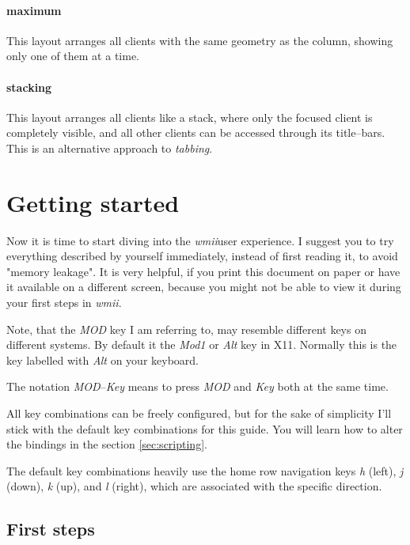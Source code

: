 \documentclass[12pt,a4paper]{article} %
\newcommand{\wmii}{\emph{wmii}}
\begin{document}
    \paragraph{maximum} This layout arranges all clients with
    the same geometry as the column, showing only one of them at a time.
    \paragraph{stacking} This layout arranges all clients
    like a stack, where only the focused client is completely
    visible, and all other clients can be accessed through its title--bars.
    This is an alternative approach to \emph{tabbing}.

    \section{Getting started}

    Now it is time to start diving into the \wmii user experience. I suggest you
    to try everything described by yourself immediately, instead of first reading
    it, to avoid "memory leakage".  It is very helpful, if you print this
    document on paper or have it available on a different screen, because you might not
    be able to view it during your first steps in \wmii.

    Note, that the \emph{MOD} key I am referring to, may resemble
    different keys on different systems. By default it the 
    \emph{Mod1} or \emph{Alt} key in X11. Normally this is the key labelled with
    \emph{Alt} on your keyboard.

    The notation \emph{MOD}--\emph{Key} means to press \emph{MOD} and 
    \emph{Key} both at the same time.

    All key combinations can be freely configured, but for the sake of
    simplicity I'll stick with the default key combinations for this
    guide.  You will learn how to alter the bindings in the
    section \ref{sec:scripting}.

    The default key combinations heavily use the home row navigation keys
    \emph{h} (left), \emph{j} (down), \emph{k} (up), and \emph{l} (right),
    which are associated with the specific direction.

    \subsection{First steps}
    \label{subsec:firststeps}
\end{document}

